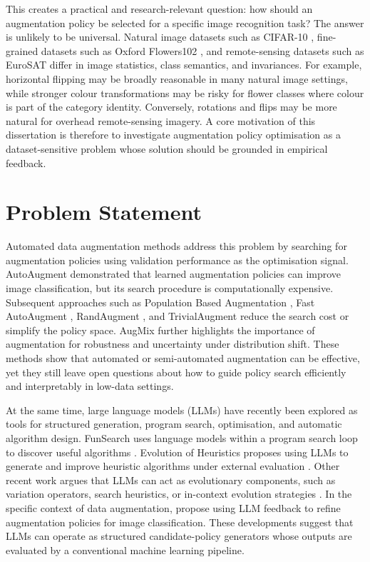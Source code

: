 \documentclass[12pt,a4paper]{report}
\begin{document}
This creates a practical and research-relevant question: how should an augmentation policy be selected for a specific image recognition task? The answer is unlikely to be universal. Natural image datasets such as CIFAR-10 \citep{krizhevsky2009learning}, fine-grained datasets such as Oxford Flowers102 \citep{nilsback2008automated}, and remote-sensing datasets such as EuroSAT \citep{helber2019eurosat} differ in image statistics, class semantics, and invariances. For example, horizontal flipping may be broadly reasonable in many natural image settings, while stronger colour transformations may be risky for flower classes where colour is part of the category identity. Conversely, rotations and flips may be more natural for overhead remote-sensing imagery. A core motivation of this dissertation is therefore to investigate augmentation policy optimisation as a dataset-sensitive problem whose solution should be grounded in empirical feedback.

\section{Problem Statement}

Automated data augmentation methods address this problem by searching for augmentation policies using validation performance as the optimisation signal. AutoAugment \citep{cubuk2019autoaugment} demonstrated that learned augmentation policies can improve image classification, but its search procedure is computationally expensive. Subsequent approaches such as Population Based Augmentation \citep{ho2019population}, Fast AutoAugment \citep{lim2019fast}, RandAugment \citep{cubuk2020randaugment}, and TrivialAugment \citep{muller2021trivialaugment} reduce the search cost or simplify the policy space. AugMix \citep{hendrycks2020augmix} further highlights the importance of augmentation for robustness and uncertainty under distribution shift. These methods show that automated or semi-automated augmentation can be effective, yet they still leave open questions about how to guide policy search efficiently and interpretably in low-data settings.

At the same time, large language models (LLMs) have recently been explored as tools for structured generation, program search, optimisation, and automatic algorithm design. FunSearch uses language models within a program search loop to discover useful algorithms \citep{romera2024funsearch}. Evolution of Heuristics proposes using LLMs to generate and improve heuristic algorithms under external evaluation \citep{liu2024eoh}. Other recent work argues that LLMs can act as evolutionary components, such as variation operators, search heuristics, or in-context evolution strategies \citep{lange2024llmes,wang2024llmea,meyerson2024lmcrossover,stein2024llamea}. In the specific context of data augmentation, \citet{duru2024adaptive} propose using LLM feedback to refine augmentation policies for image classification. These developments suggest that LLMs can operate as structured candidate-policy generators whose outputs are evaluated by a conventional machine learning pipeline.
\end{document}
